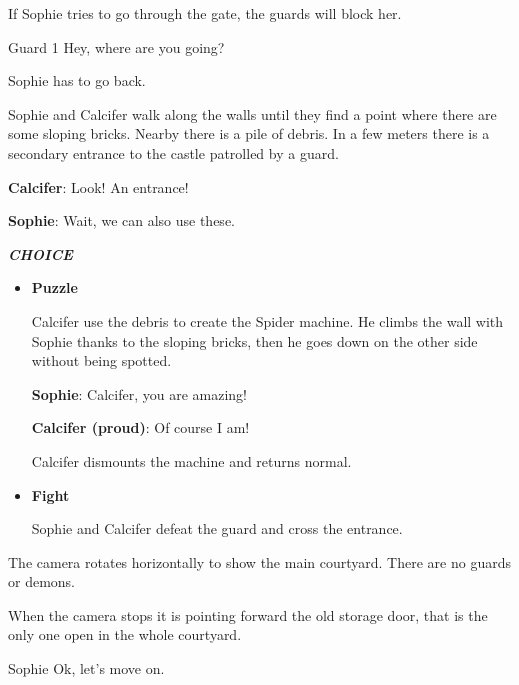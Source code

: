 If Sophie tries to go through the gate, the guards will block her.

\begin{screenplay}

\begin{dialogue}{Guard 1}
Hey, where are you going?
\end{dialogue}

Sophie has to go back.

\end{screenplay}
\vspace{1em}


Sophie and Calcifer walk along the walls until they find a point where there are some sloping bricks. Nearby there is a pile of debris.
In a few meters there is a secondary entrance to the castle patrolled by a guard.

\textbf{Calcifer}: Look! An entrance!

\textbf{Sophie}: Wait, we can also use these.

\textit{\textbf{CHOICE}}
\begin{itemize}
  \item \textbf{Puzzle}
  
  Calcifer use the debris to create the Spider machine. He climbs the wall with Sophie thanks to the sloping bricks, then he goes down on the other side without being spotted.
  
  \textbf{Sophie}: Calcifer, you are amazing!
  
  \textbf{Calcifer (proud)}: Of course I am!

  Calcifer dismounts the machine and returns normal.

  \item \textbf{Fight}
    
  Sophie and Calcifer defeat the guard and cross the entrance.
\end{itemize}


\begin{screenplay}

The camera rotates horizontally to show the main courtyard. There are no guards or demons.

When the camera stops it is pointing forward the old storage door, that is the only one open in the whole courtyard.

\begin{dialogue}{Sophie}
Ok, let's move on.
\end{dialogue}

\end{screenplay}
\vspace{1em}

